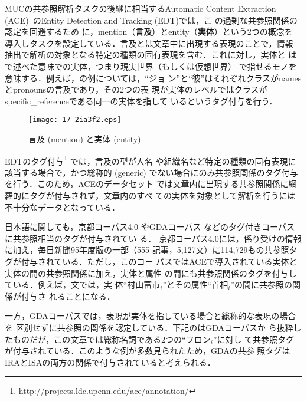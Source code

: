 \documentclass[japanese]{jnlp_1.4}
\def\sec#1{}
\def\fig#1{}
\begin{document}
MUCの共参照解析タスクの後継に相当するAutomatic Content Extraction
(ACE)~\cite{Doddington:04}のEntity Detection and Tracking (EDT)では，こ
の過剰な共参照関係の認定を回避するため
に，mention（\textbf{言及}）とentity（\textbf{実体}）という2つの概念を
導入しタスクを設定している．言及とは文章中に出現する表現のことで，情報
抽出で解析の対象となる特定の種類の固有表現を含む．これに対し，実体と
は\sec{second}で述べた意味での実体，つまり現実世界（もしくは仮想世界）
で指せるモノを意味する．例えば，\fig{ace}の例については，``ジョ
ン''と``彼''はそれぞれクラスがnamesとpronounsの言及であり，その2つの表
現が実体のレベルではクラスがspecific\_referenceである同一の実体を指して
いるというタグ付与を行う．

\begin{figure}[t]
\begin{center}
  \texttt{[image: 17-2ia3f2.eps]}
\end{center}
  \caption{言及 (mention) と実体 (entity)}
  \label{fig:ace}
\end{figure}

EDTのタグ付与\footnote{
    http://projects.ldc.upenn.edu/ace/annotation/} では，言及の型が人名
や組織名など特定の種類の固有表現に該当する場合で，かつ総称的 (generic) 
でない場合にのみ共参照関係のタグ付与を行う．このため，ACEのデータセット
では文章内に出現する共参照関係に網羅的にタグが付与されず，文章内のすべ
ての実体を対象として解析を行うには不十分なデータとなっている．


日本語に関しても，京都コーパス4.0 \cite{Kawahara:02}やGDAコーパス
\cite{Hasida:05}などのタグ付きコーパスに共参照相当のタグが付与されてい
る．
京都コーパス4.0には，係り受けの情報に加え，毎日新聞95年度版の一部（555
記事，5,127文）に114,729もの共参照タグが付与されている．ただし，このコー
パスではACEで導入されている実体と実体の間の共参照関係に加え，実体と属性
の間にも共参照関係のタグを付与している．例えば，文では，実
体``村山富市$_i$''とその属性``\nobreak 首相$_i$''の間に共参照の関係が付与さ
れることになる．

一方，GDAコーパスでは，表現が実体を指している場合と総称的な表現の場合を
区別せずに共参照の関係を認定している．下記のはGDAコーパスか
ら抜粋したものだが，この文章では総称名詞である2つの``フロン$_i$''に対し
て共参照タグが付与されている．このような例が多数見られたため，GDAの共参
照タグはIRAとISAの両方の関係で付与されていると考えられる．
\end{document}
